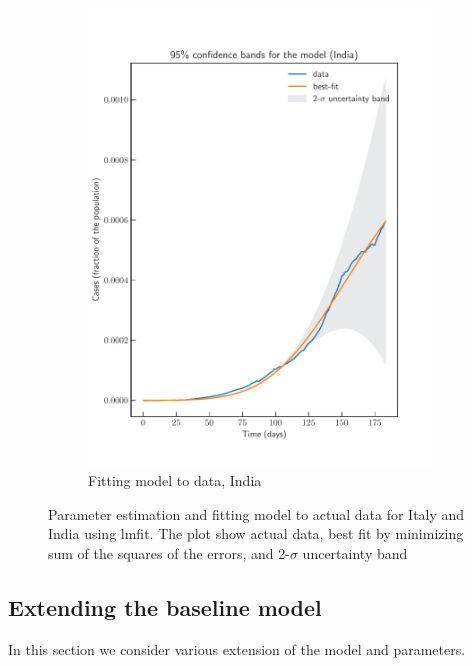 \documentclass[authoryear,preprint]{elsarticle}
\begin{document}
\begin{figure}[t!]
\begin{subfigure}{.5\textwidth}
		\includegraphics[width=\linewidth]{India_model_confidence.pdf}
		\caption{Fitting model to data, India}
		\label{fig-fitness-1B}
	\end{subfigure}
	\caption{Parameter estimation and fitting model to actual data for Italy and India using lmfit. The plot show actual data, best fit by minimizing sum of the squares of the errors, and 2-$\sigma$ uncertainty band  }
	\label{fig-fitness-1}
\end{figure}

\subsection{Extending the baseline model}
In this section we consider various extension of the model and parameters. 
\end{document}

